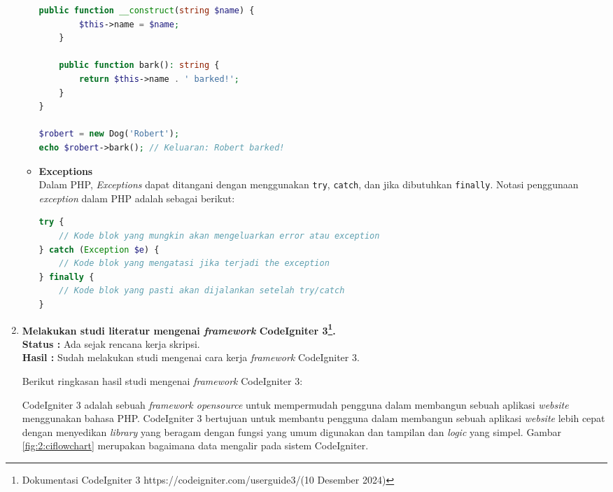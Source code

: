 \documentclass[a4paper,twoside]{article}
\begin{document}
\begin{enumerate}
\begin{itemize}
\begin{lstlisting}[language={php}, caption={Contoh Kelas}, label={kode:5:class_ex}]
	public function __construct(string $name) {
		$this->name = $name;
	}
	
	public function bark(): string {
		return $this->name . ' barked!';
	}
}

$robert = new Dog('Robert');
echo $robert->bark(); // Keluaran: Robert barked!
					\end{lstlisting}

		      \item \textbf{Exceptions} \\
		            Dalam PHP, \textit{Exceptions} dapat ditangani dengan menggunakan \verb|try|, \verb|catch|, dan jika dibutuhkan \verb|finally|. Notasi penggunaan \textit{exception} dalam PHP adalah sebagai berikut:

		            \begin{lstlisting}[language={php}, caption={Notasi Penggunaan Exception}, label={kode:5:exception_notasi}]
try {
    // Kode blok yang mungkin akan mengeluarkan error atau exception
} catch (Exception $e) {
    // Kode blok yang mengatasi jika terjadi the exception
} finally {
    // Kode blok yang pasti akan dijalankan setelah try/catch
}
			  \end{lstlisting}

	      \end{itemize}




	\item \textbf{Melakukan studi literatur mengenai \textit{framework} CodeIgniter 3\footnote{Dokumentasi CodeIgniter 3 https://codeigniter.com/userguide3/(10 Desember 2024)}.} \\
	      {\bf Status :} Ada sejak rencana kerja skripsi.\\
	      {\bf Hasil :} Sudah melakukan studi mengenai cara kerja \textit{framework} CodeIgniter 3.

	      Berikut ringkasan hasil studi mengenai \textit{framework} CodeIgniter 3:

	      CodeIgniter 3 adalah sebuah \textit{framework opensource} untuk mempermudah pengguna dalam membangun sebuah aplikasi \textit{website} menggunakan bahasa PHP. CodeIgniter 3 bertujuan untuk membantu pengguna dalam membangun sebuah aplikasi \textit{website} lebih cepat dengan menyedikan \textit{library} yang beragam dengan fungsi yang umum digunakan dan tampilan dan \textit{logic} yang simpel. Gambar \ref{fig:2:ciflowchart} merupakan bagaimana data mengalir pada sistem CodeIgniter.


\end{enumerate}
\end{document}
